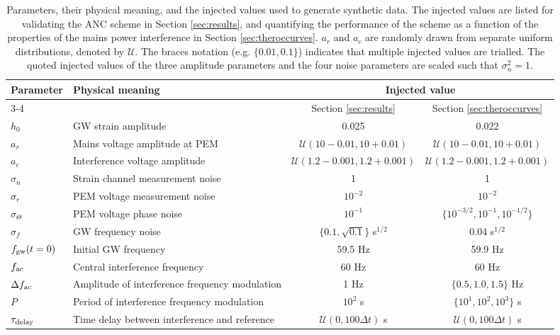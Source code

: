 \documentclass[pra,superscriptaddress,reprint,amsmath,amssymb,nofootinbib]{revtex4-2}
\begin{document}
\begin{table}

	\begin{tabular}{llcc}
		\hline 

		 \multirow{2}{*}{Parameter} & \multirow{2}{*}{Physical meaning}  & \multicolumn{2}{c}{Injected value} \\
		\cline{3-4}
			 &  &Section \ref{sec:results} & Section \ref{sec:theroccurves}    \\
		\hline
		$h_0$  &    GW strain amplitude & 0.025& 0.022 \\ 
		$a_r$ & Mains voltage amplitude at PEM & $\mathcal{U}(10-0.01,10+0.01)$& $\mathcal{U}(10-0.01,10+0.01)$ \\
		$a_c$ & Interference voltage amplitude &$\mathcal{U}(1.2-0.001,1.2+0.001)$& $\mathcal{U}(1.2-0.001,1.2+0.001)$ \\
		$\sigma_n$ & Strain channel measurement noise &1& 1 \\
		$\sigma_r$  & PEM voltage measurement noise & $10^{-2}$&$10^{-2}$ \\
		$\sigma_{\Theta}$ & PEM voltage phase noise  & $10^{-1}$& $\{ 10^{-3/2}, 10^{-1}, 10^{-1/2}\}$\\
		$\sigma_f$ &  GW frequency noise & $\{0.1,\sqrt{0.1}\}$ s$^{1/2}$& 0.04 s$^{1/2}$\\
		$f_{\rm gw}(t=0)$ &  Initial GW frequency  & 59.5 Hz& 59.9 Hz\\
		$ f_{\rm ac}$ &  Central interference frequency & 60 Hz& 60 Hz\\ 
		$\Delta f_{\rm ac}$ &  Amplitude of interference frequency modulation  & 1 Hz& $\{0.5, 1.0, 1.5\}$ Hz\\
		$P$ & Period of interference frequency modulation & $10^2$ s& $\{ 10^{1}, 10^2, 10^3\}$ s \\
		$\tau_{\rm delay}$ & Time delay between interference and reference & $\mathcal{U}(0,100 \Delta t)$ s& $\mathcal{U}(0,100 \Delta t)$ s \\
		\hline
	\end{tabular} 
	\caption{Parameters, their physical meaning, and the injected values used to generate synthetic data. The injected values are listed for validating the ANC scheme in Section \ref{sec:results}, and quantifying the performance of the scheme as a function of the properties of the mains power interference in Section  \ref{sec:theroccurves}. $a_r$ and $a_c$ are randomly drawn from separate uniform distributions, denoted by $\mathcal{U}$. The braces notation (e.g. $\{0.01, 0.1\}$) indicates that multiple injected values are trialled. The quoted injected values of the three amplitude parameters and the four noise parameters are scaled such that $\sigma_n^2 = 1$.}
	\label{tab:parameterdescription1}
\end{table}
\end{document}
